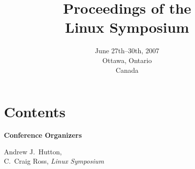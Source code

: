 \documentclass[twoside,12pt]{book}
\begin{document}
\frontmatter


\title{Proceedings of the\\
Linux Symposium}
\author{\vspace{4in}}
\date{June 27th--30th, 2007\\
 Ottawa, Ontario\\
 Canada}
\maketitle
\thispagestyle{empty}
\cleardoublepage


\section*{Contents}
\begin{raggedright}
\begin{list}{}{%
  \setlength{\rightmargin}{0pt}
  \setlength{\labelwidth}{0pt}
  \setlength{\labelsep}{0pt}
  \setlength{\topsep}{0pt}
  \setlength{\partopsep}{0pt}
  \setlength{\itemsep}{24pt plus6pt minus6pt}
  \setlength{\leftmargin}{2em}
  \setlength{\itemindent}{-\leftmargin}
  \setlength{\listparindent}{0pt}}



\end{list}
\end{raggedright}

\cleardoublepage


\vspace{2cm}

\textbf{{\Large Conference Organizers}}

\vspace{5mm}
\begin{large}
\begin{raggedright}
\hspace*{0.5in}Andrew J.\ Hutton, \\[1ex]
\hspace*{0.5in}C.\ Craig Ross, \hspace*{1ex}\textit{Linux Symposium}
\end{raggedright}
\end{large}
\end{document}
